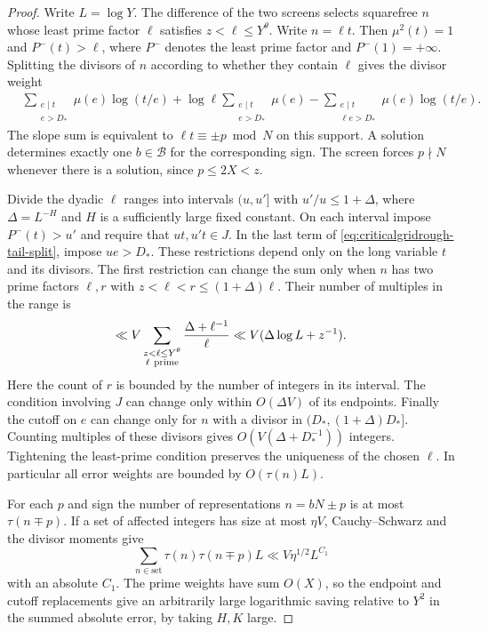 \documentclass[11pt,a4paper]{article}
\numberwithin{equation}{section}
\begin{document}
\begin{proof}
Write $L=\log Y$. The difference of the two screens
selects squarefree $n$ whose least
prime factor $\ell$ satisfies $z<\ell\le Y^\theta$.
Write $n=\ell t$. Then $\mu^2(t)=1$ and
$P^-(t)>\ell$, where $P^-$ denotes the least prime
factor and $P^-(1)=+\infty$. Splitting the divisors
of $n$ according to whether they contain $\ell$ gives
the divisor weight
\begin{align}
 &\sum_{\substack{e\mid t\\e>D_*}}\mu(e)\log(t/e)
 +\log\ell\sum_{\substack{e\mid t\\e>D_*}}\mu(e)
 -\sum_{\substack{e\mid t\\\ell e>D_*}}\mu(e)\log(t/e).
 \label{eq:criticalgridrough-tail-split}
\end{align}
The slope sum is equivalent to $\ell t\equiv\pm p\bmod N$
on this support. A solution determines exactly one
$b\in\mathcal B$ for the corresponding sign. The screen
forces $p\nmid N$ whenever there is a solution, since
$p\le2X<z$.

Divide the dyadic $\ell$ ranges into intervals
$(u,u']$ with $u'/u\le1+\Delta$, where $\Delta=L^{-H}$
and $H$ is a sufficiently large fixed constant.
On each interval impose $P^-(t)>u'$ and require
that $ut,u't\in J$. In the last term of
\cref{eq:criticalgridrough-tail-split}, impose $ue>D_*$.
These restrictions depend only on the long variable
$t$ and its divisors. The first restriction can change
the sum only when $n$ has two prime factors $\ell,r$
with $z<\ell<r\le(1+\Delta)\ell$. Their number of
multiples in the range is
\[
 \ll V\sum_{\substack{z<\ell\le Y^\theta\\\ell\ {\rm prime}}}
             \frac{\Delta+\ell^{-1}}{\ell}
 \ll V(\Delta\log L+z^{-1}).
\]
Here the count of $r$ is bounded by the number of
integers in its interval. The condition involving $J$
can change only within $O(\Delta V)$ of its endpoints.
Finally the cutoff on $e$ can change only for $n$
with a divisor in $(D_*,(1+\Delta)D_*]$. Counting
multiples of these divisors gives $O(V(\Delta+D_*^{-1}))$
integers. Tightening the least-prime condition preserves
the uniqueness of the chosen $\ell$. In particular all
error weights are bounded by $O(\tau(n)L)$.

For each $p$ and sign the number of representations
$n=bN\pm p$ is at most $\tau(n\mp p)$. If a set of
affected integers has size at most $\eta V$, Cauchy--Schwarz
and the divisor moments give
\[
 \sum_{n\in\text{set}}\tau(n)\tau(n\mp p)L
     \ll V \eta^{1/2} L^{C_1}
\]
with an absolute $C_1$. The prime weights have sum
$O(X)$, so the endpoint and cutoff replacements give
an arbitrarily large logarithmic saving relative to $Y^2$
in the summed absolute error, by taking $H,K$ large.


\end{proof}
\end{document}
